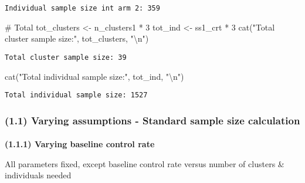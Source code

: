 \documentclass[
  letterpaper,
  DIV=11,
  numbers=noendperiod]{scrartcl}
\makeatletter
\let\oldparagraph\paragraph
\renewcommand{\paragraph}{
    \@ifstar
      \xxxParagraphStar
      \xxxParagraphNoStar
  }
\newcommand{\xxxParagraphStar}[1]{\oldparagraph*{#1}\mbox{}}
\newcommand{\xxxParagraphNoStar}[1]{\oldparagraph{#1}\mbox{}}
\newenvironment{Shaded}{\begin{snugshade}}{\end{snugshade}}
\newcommand{\CommentTok}[1]{\textcolor[rgb]{0.37,0.37,0.37}{#1}}
\newcommand{\DecValTok}[1]{\textcolor[rgb]{0.68,0.00,0.00}{#1}}
\newcommand{\FunctionTok}[1]{\textcolor[rgb]{0.28,0.35,0.67}{#1}}
\newcommand{\NormalTok}[1]{\textcolor[rgb]{0.00,0.23,0.31}{#1}}
\newcommand{\OtherTok}[1]{\textcolor[rgb]{0.00,0.23,0.31}{#1}}
\newcommand{\SpecialCharTok}[1]{\textcolor[rgb]{0.37,0.37,0.37}{#1}}
\newcommand{\StringTok}[1]{\textcolor[rgb]{0.13,0.47,0.30}{#1}}
\makeatother
\begin{document}
\begin{verbatim}
Individual sample size int arm 2: 359 
\end{verbatim}

\begin{Shaded}
\begin{Highlighting}[]
\CommentTok{\# Total}
\NormalTok{tot\_clusters }\OtherTok{\textless{}{-}}\NormalTok{ n\_clusters1 }\SpecialCharTok{*} \DecValTok{3}
\NormalTok{tot\_ind }\OtherTok{\textless{}{-}}\NormalTok{ ss1\_crt }\SpecialCharTok{*} \DecValTok{3}
\FunctionTok{cat}\NormalTok{(}\StringTok{"Total cluster sample size:"}\NormalTok{, tot\_clusters, }\StringTok{"}\SpecialCharTok{\textbackslash{}n}\StringTok{"}\NormalTok{)}
\end{Highlighting}
\end{Shaded}

\begin{verbatim}
Total cluster sample size: 39 
\end{verbatim}

\begin{Shaded}
\begin{Highlighting}[]
\FunctionTok{cat}\NormalTok{(}\StringTok{"Total individual sample size:"}\NormalTok{, tot\_ind, }\StringTok{"}\SpecialCharTok{\textbackslash{}n}\StringTok{"}\NormalTok{)}
\end{Highlighting}
\end{Shaded}

\begin{verbatim}
Total individual sample size: 1527 
\end{verbatim}

\subsubsection{\texorpdfstring{\textbf{(1.1) Varying assumptions -
Standard sample size
calculation}}{(1.1) Varying assumptions - Standard sample size calculation}}\label{varying-assumptions---standard-sample-size-calculation}

\paragraph{\texorpdfstring{\textbf{(1.1.1) Varying baseline control
rate}}{(1.1.1) Varying baseline control rate}}\label{varying-baseline-control-rate}

All parameters fixed, except baseline control rate versus number of
clusters \& individuals needed
\end{document}
